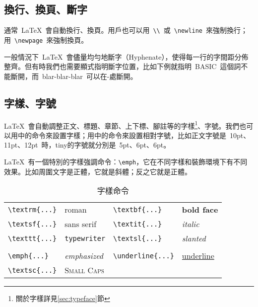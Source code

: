 \subsection{換行、換頁、斷字}
通常~\LaTeX~會自動換行、換頁。用戶也可以用~\verb|\\|~或~\verb|\newline|~來強制換行；用~\verb|\newpage|~來強制換頁。

一般情況下~\LaTeX~會儘量均勻地斷字（Hyphenate），使得每一行的字間距分佈整齊。但有時我們也需要顯式指明斷字位置，比如下例就指明~BASIC~這個詞不能斷開，而~blar-blar-blar~可以在-處斷開。
\begin{code}
\end{code}

\subsection{字樣、字號}

\LaTeX~會自動調整正文、標題、章節、上下標、腳註等的字樣\footnote{關於字樣詳見\ref{sec:typeface}節}、字號。我們也可以用中的命令來設置字樣；用中的命令來設置相對字號，比如正文字號是~10pt、11pt、12pt~時，tiny的字號就分別是~5pt、6pt、6pt。

\LaTeX~有一個特別的字樣強調命令：\verb|\emph|，它在不同字樣和裝飾環境下有不同效果。比如周圍文字是正體，它就是斜體；反之它就是正體。

\begin{table}[hbtp]
\centering
\caption{字樣命令}
\label{tab:typeface_command}
\begin{tabular}{llll}
    \toprule
    \verb|\textrm{...}| & \textrm{roman} & 
    \verb|\textbf{...}| & \textbf{bold face} \\
    \verb|\textsf{...}| & \textsf{sans serif} & 
    \verb|\textit{...}| & \textit{italic} \\
    \verb|\texttt{...}| & \texttt{typewriter} & 
    \verb|\textsl{...}| & \textsl{slanted} \\
    \\
    \verb|\emph{...}|   & \emph{emphasized} & 
    \verb|\underline{...}|  & \underline{underline} \\
    \verb|\textsc{...}| & \textsc{Small Caps} & & \\
    \bottomrule
\end{tabular}
\end{table}

